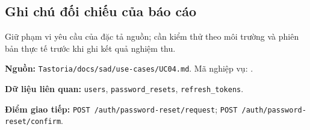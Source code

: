 \subsection{Ghi chú đối chiếu của báo cáo}
Giữ phạm vi yêu cầu của đặc tả nguồn; cần kiểm thử theo môi trường và phiên bản thực tế trước khi ghi kết quả nghiệm thu.

\textbf{Nguồn:} {\small\texttt{Tastoria/\allowbreak{}\allowbreak{}docs/\allowbreak{}\allowbreak{}sad/\allowbreak{}\allowbreak{}use-\allowbreak{}cases/\allowbreak{}\allowbreak{}UC04.\allowbreak{}md}}. Mã nghiệp vụ: .

\textbf{Dữ liệu liên quan:} {\small\texttt{users}}, {\small\texttt{password\_\allowbreak{}\allowbreak{}resets}}, {\small\texttt{refresh\_\allowbreak{}\allowbreak{}tokens}}.

\textbf{Điểm giao tiếp:} {\small\texttt{POST /\allowbreak{}\allowbreak{}auth/\allowbreak{}\allowbreak{}password-\allowbreak{}reset/\allowbreak{}\allowbreak{}request}}; {\small\texttt{POST /\allowbreak{}\allowbreak{}auth/\allowbreak{}\allowbreak{}password-\allowbreak{}reset/\allowbreak{}\allowbreak{}confirm}}.
